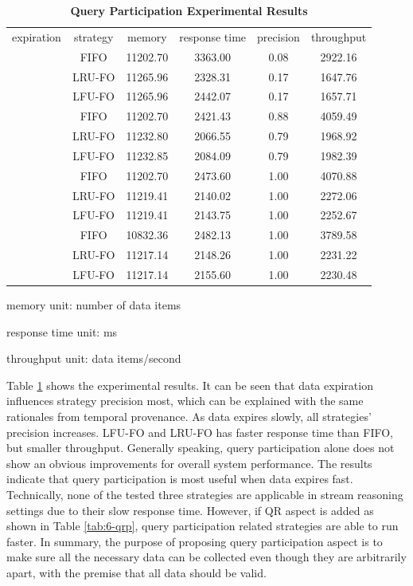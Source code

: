 \begin{table}[!htbp]
	\centering
    \caption{\textbf{\textbf{Query Participation Experimental Results}}}
    \label{tab:6-qpp}
    \begin{tabular}{|c||c||c|c|c|c|} \hline
    expiration & strategy & memory & response time & precision & throughput \\ \hhline{|=#=#=|=|=|=|}
    \multirow{3}{*}{quick} & FIFO   & 11202.70 & 3363.00 & 0.08 & 2922.16 \\ \cline{2-6} 
 					      & LRU-FO & 11265.96 & 2328.31 & 0.17 & 1647.76 \\ \cline{2-6} 
 					      & LFU-FO & 11265.96 & 2442.07 & 0.17 & 1657.71 \\ \hhline{|=#=#=|=|=|=|}
	\multirow{3}{*}{normal} & FIFO   & 11202.70 & 2421.43 & 0.88 & 4059.49 \\ \cline{2-6} 
 						    & LRU-FO & 11232.80 & 2066.55 & 0.79 & 1968.92 \\ \cline{2-6} 
 						    & LFU-FO & 11232.85 & 2084.09 & 0.79 & 1982.39 \\ \hhline{|=#=#=|=|=|=|}
	\multirow{3}{*}{slow} & FIFO & 11202.70   & 2473.60 & 1.00 & 4070.88 \\ \cline{2-6} 
					      & LRU-FO & 11219.41 & 2140.02 & 1.00 & 2272.06 \\ \cline{2-6} 
 					      & LFU-FO & 11219.41 & 2143.75 & 1.00 & 2252.67 \\ \hhline{|=#=#=|=|=|=|}
    \multirow{3}{*}{none} & FIFO & 10832.36 & 2482.13 & 1.00 & 3789.58 \\ \cline{2-6}
    					  & LRU-FO & 11217.14 & 2148.26 & 1.00 & 2231.22 \\ \cline{2-6}
                          & LFU-FO & 11217.14 & 2155.60 & 1.00 & 2230.48 \\ \hline
	\end{tabular}
    \begin{tablenotes}
 		\item memory unit: number of data items
 		\item response time unit: ms
 		\item throughput unit: data items/second
    \end{tablenotes}
\end{table}

Table \ref{tab:6-qpp} shows the experimental results. 
It can be seen that data expiration influences strategy precision most, which can be explained with the same rationales from temporal provenance. 
As data expires slowly, all strategies' precision increases. 
LFU-FO and LRU-FO has faster response time than FIFO, but smaller throughput. 
Generally speaking, query participation alone does not show an obvious improvements for overall system performance.
The results indicate that query participation is most useful when data expires fast.
Technically, none of the tested three strategies are applicable in stream reasoning settings due to their slow response time. 
However, if QR aspect is added as shown in Table \ref{tab:6-qrp}, query participation related strategies are able to run faster. 
In summary, the purpose of proposing query participation aspect is to make sure all the necessary data can be collected even though they are arbitrarily apart, with the premise that all data should be valid.
%
